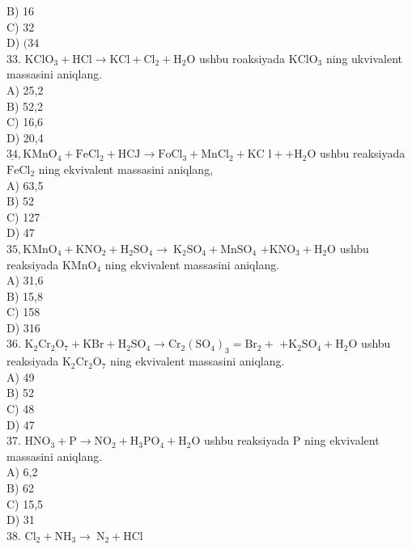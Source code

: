 B) 16\\
C) 32\\
D) $(34$\\
33. $\mathrm{KClO}_{3}+\mathrm{HCl} \rightarrow \mathrm{KCl}+\mathrm{Cl}_{2}+\mathrm{H}_{2} \mathrm{O}$ ushbu roaksiyada $\mathrm{KClO}_{3}$ ning ukvivalent massasini aniqlang.\\
A) 25,2\\
B) 52,2\\
C) 16,6\\
D) 20,4\\
$\underline{34}, \mathrm{KMnO}_{4}+\mathrm{FeCl}_{2}+\mathrm{HCJ} \rightarrow \mathrm{FoCl}_{3}+\mathrm{MnCl}_{2}+\mathrm{KC}$ $\mathrm{l}++\mathrm{H}_{2} \mathrm{O}$ ushbu reaksiyada $\mathrm{FeCl}_{2}$ ning ekvivalent massasini aniqlang,\\
A) 63,5\\
B) 52\\
C) 127\\
D) 47\\
$35, \mathrm{KMnO}_{4}+\mathrm{KNO}_{2}+\mathrm{H}_{2} \mathrm{SO}_{4} \rightarrow \mathrm{~K}_{2} \mathrm{SO}_{4}+\mathrm{MnSO}_{4}$ $+\mathrm{KNO}_{3}+\mathrm{H}_{2} \mathrm{O}$ ushbu reaksiyada $\mathrm{KMnO}_{4}$ ning ekvivalent massasini aniqlang.\\
A) 31,6\\
B) 15,8\\
C) 158\\
D) 316\\
36. $\mathrm{K}_{2} \mathrm{Cr}_{2} \mathrm{O}_{7}+\mathrm{KBr}+\mathrm{H}_{2} \mathrm{SO}_{4} \rightarrow \mathrm{Cr}_{2}\left(\mathrm{SO}_{4}\right)_{3}=\mathrm{Br}_{2}+$ $+\mathrm{K}_{2} \mathrm{SO}_{4}+\mathrm{H}_{2} \mathrm{O}$ ushbu reaksiyada $\mathrm{K}_{2} \mathrm{Cr}_{2} \mathrm{O}_{7}$ ning ekvivalent massasini aniqlang.\\
A) 49\\
B) 52\\
C) 48\\
D) 47\\
37. $\mathrm{HNO}_{3}+\mathrm{P} \rightarrow \mathrm{NO}_{2}+\mathrm{H}_{3} \mathrm{PO}_{4}+\mathrm{H}_{2} \mathrm{O}$ ushbu reaksiyada P ning ekvivalent massasini aniqlang.\\
A) 6,2\\
B) 62\\
C) 15,5\\
D) 31\\
38. $\mathrm{Cl}_{2}+\mathrm{NH}_{3} \rightarrow \mathrm{~N}_{2}+\mathrm{HCl}$\\
